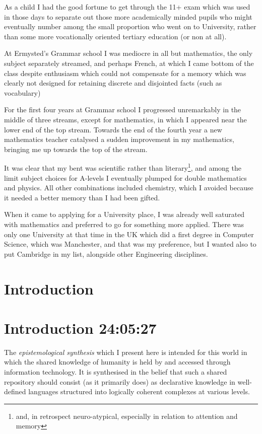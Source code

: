 \documentclass[10pt,titlepage]{book}
\begin{document}
As a child I had the good fortune to get through the 11+ exam which was used in those days to separate out those more academically minded pupils who might eventually number among the small proportion who went on to University, rather than some more vocationally oriented tertiary education (or non at all).

At Ermysted's Grammar school I was mediocre in all but mathematics, the only subject separately streamed, and perhaps French, at which I came bottom of the class despite enthusiasm which could not compensate for a memory which was clearly not designed for retaining discrete and disjointed facts (such as vocabulary)

For the first four years at Grammar school I progressed unremarkably in the middle of three streams, except for mathematics, in which I appeared near the lower end of the top stream.
Towards the end of the fourth year a new mathematics teacher catalysed a sudden improvement in my mathematics, bringing me up towards the top of the stream.

It was clear that my bent was scientific rather than literary\footnote{and, in retrospect neuro-atypical, especially in relation to attention and memory}, and among the limit subject choices for A-levels I eventually plumped for double mathematics and physics.
All other combinations included chemistry, which I avoided because it needed a better memory than I had been gifted.

When it came to applying for a University place, I was already well saturated with mathematics and preferred to go for something more applied.
There was only one University at that time in the UK which did a first degree in Computer Science, which was Manchester, and that was my preference, but I wanted also to put Cambridge in my list, alongside other Engineering disciplines.


\chapter{Introduction}




\chapter{Introduction 24:05:27}

The \emph{epistemological synthesis} which I present here is intended for this world in which the shared knowledge of humanity is held by and accessed through information technology.
It is synthesised in the belief that such a shared repository should consist (as it primarily does) as declarative knowledge in well-defined languages structured into logically coherent complexes at various levels.
\end{document}
